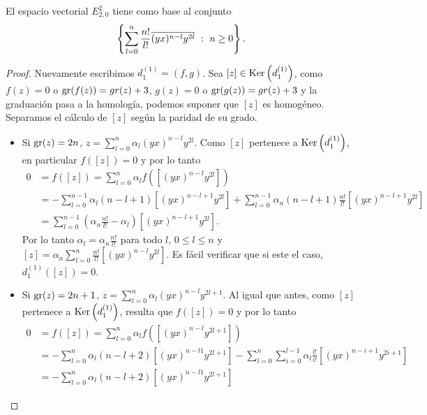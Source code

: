 \documentclass[fleqn,../tesis.tex]{subfiles}
\begin{document}
\begin{prop}
    El espacio vectorial $E^{2}_{2, 0}$ tiene como base al conjunto
    \[
        \left\{ \sum_{l = 0}^n \frac{n!}{l!}\overline{(yx)^{n - l}y^{2l}} \ :\ n \geq 0\right\}.
    \]
\end{prop}
\begin{proof}
    Nuevamente escribimos $d_1^{(1)} = (f, g)$. Sea $[z] \in \operatorname{Ker}\left(d_{1}^{(1)}\right)$,
    como $f(z) = 0$ o $\operatorname{gr}(f(z)) = gr(z) + 3$, $g(z) = 0$ o $\operatorname{gr}(g(z)) = gr(z) + 3$ y la graduación pasa a la homología, podemos
    suponer que $[z]$ es homogéneo. Separamos el cálculo de $[z]$ según la paridad de su grado.
    \begin{itemize}
        \item Si $\operatorname{gr}(z) = 2n$, $z = \sum_{l = 0}^n \alpha_l (yx)^{n - l}y^{2l}$.
        Como $[z]$ pertenece a $\operatorname{Ker}\left(d_{1}^{(1)}\right)$, en particular $f([z]) = 0$ y por lo tanto
        \begin{align*}
            0 &= f([z]) = \sum_{l = 0}^{n}\alpha_l f\left(\left[(yx)^{n - l}y^{2l}\right]\right)\\
            &= -\sum_{l = 0}^{n - 1} \alpha_l (n - l + 1)\left[(yx)^{n - l + 1}y^{2l}\right]
                + \sum_{l = 0}^{n - 1} \alpha_n (n - l + 1) \frac{n!}{l!}\left[(yx)^{n - l + 1}y^{2l}\right] \\
            &= \sum_{l = 0}^{n - 1} \left(\alpha_n \frac{n!}{l!} - \alpha_l\right)\left[(yx)^{n - l + 1}y^{2l}\right]. 
        \end{align*}
        Por lo tanto $\alpha_l = \alpha_n \frac{n!}{l!}$ para todo $l$, $0 \leq l \leq n$ y
        $[z] = \alpha_n \sum_{l = 0}^n \frac{n!}{l!}\left[(yx)^{n - l}y^{2l}\right]$. Es fácil verificar que si este el caso,
        $d_{1}^{(1)}([z]) = 0$.
        \item Si $\operatorname{gr}(z) = 2n + 1$, $z = \sum_{l = 0}^n \alpha_l (yx)^{n - l}y^{2l + 1}$. Al igual que antes, como $[z]$ pertenece a $\operatorname{Ker}\left(d_{1}^{(1)}\right)$, resulta que $f([z]) = 0$ y por lo tanto
        \begin{align*}
            0 &= f([z]) = \sum_{l = 0}^n \alpha_l f\left( \left[(yx)^{n - l}y^{2l + 1}\right] \right)\\
            &= -\sum_{l = 0}^n \alpha_l (n - l + 2)\left[(yx)^{n - l 1}y^{2l + 1}\right]
                - \sum_{l = 0}^{n} \sum_{i = 0}^{l - 1}\alpha_l \frac{l!}{i!} \left[(yx)^{n - i + 1}y^{2i + 1}\right]\\
            &= -\sum_{l = 0}^n \alpha_l (n - l + 2)\left[(yx)^{n - l 1}y^{2l + 1}\right]

\end{align*}
\end{itemize}
\end{proof}
\end{document}
